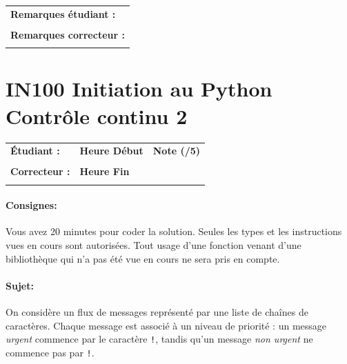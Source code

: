 \documentclass[a4paper,11pt]{article}
\begin{document}
\vspace{-0.6 cm}
\begin{table}[h!]
\centering
\renewcommand{\arraystretch}{1.4} %
\begin{tabular}{|p{15cm}|}
\hline
\textbf{Remarques étudiant :}    \\
 \\
\hline
\textbf{Remarques correcteur :}  \\
 \\
\hline
\end{tabular}
\end{table}


\newpage


\section*{\center IN100 Initiation au Python\\
Contrôle continu 2}

\vspace{0.5 cm}

\begin{table}[h!]
\centering
\renewcommand{\arraystretch}{1.4} %
\begin{tabular}{|p{10cm}|p{3cm}|p{2cm}|}
\hline
\textbf{Étudiant :} & \textbf{Heure Début }  & \textbf{Note (/5) }  \\
& & \\
\hline
\textbf{Correcteur :} & \textbf{Heure Fin } & \\
& & \\
\hline

\hline
\end{tabular}
\end{table}

\paragraph*{Consignes:} Vous avez 20 minutes pour coder la solution. Seules les types et les instructions vues en cours sont autorisées. Tout usage d'une fonction 
venant d'une bibliothèque qui n'a pas été vue en cours ne sera pris en compte. 



\paragraph*{Sujet:}

On considère un flux de messages représenté par une liste de chaînes de caractères.  
Chaque message est associé à un niveau de priorité : un message \emph{urgent} commence par le caractère \texttt{!},
 tandis qu'un message \emph{non urgent} ne commence pas par \texttt{!}.
\end{document}
